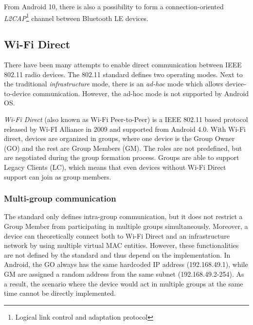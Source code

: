 \documentclass[conference,compsoc]{IEEEtran}
\begin{document}
From Android 10, there is also a possibility to form a connection-oriented \textit{L2CAP}\footnote{Logical link control and adaptation protocol} channel between Bluetooth LE devices.

\subsection{Wi-Fi Direct}

There have been many attempts to enable direct communication between IEEE 802.11 radio devices. The 802.11 standard defines two operating modes. Next to the traditional \textit{infrastructure} mode, there is an \textit{ad-hoc} mode which allows device-to-device communication. However, the ad-hoc mode is not supported by Android OS.

\textit{Wi-Fi Direct} (also known as Wi-Fi Peer-to-Peer) \cite{wifip2p} is a IEEE 802.11 based protocol released by Wi-FI Alliance in 2009 and supported from Android 4.0. With Wi-Fi direct, devices are organized in groups, where one device is the Group Owner (GO) and the rest are Group Members (GM). The roles are not predefined, but are negotiated during the group formation process. Groups are able to support Legacy Clients (LC), which means that even devices without Wi-Fi Direct support can join as group members.

\subsubsection{Multi-group communication}

The standard only defines intra-group communication, but it does not restrict a Group Member from participating in multiple groups simultaneously. Moreover, a device can theoretically connect both to Wi-Fi Direct and an infrastructure network by using multiple virtual MAC entities. However, these functionalities are not defined by the standard and thus depend on the implementation.
In Android, the GO always has the same hardcoded IP address (192.168.49.1), while GM are assigned a random address from the same subnet (192.168.49.2-254). As a result, the scenario where the device would act in multiple groups at the same time cannot be directly implemented.
\end{document}
